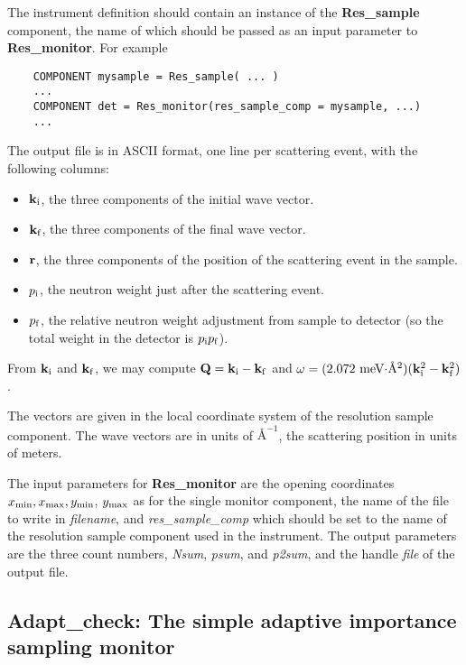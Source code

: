 The instrument definition should contain an instance of the
\textbf{Res\_sample} component, the name of which should be passed as an
input parameter to \textbf{Res\_monitor}. For example
\begin{verbatim}
    COMPONENT mysample = Res_sample( ... )
    ...
    COMPONENT det = Res_monitor(res_sample_comp = mysample, ...)
    ...
\end{verbatim}

The output file is in ASCII format, one line per scattering event, with
the following columns:
\begin{itemize}
\item ${\bf k}_{\rm i}$, the three components of the initial wave vector.
\item ${\bf k}_{\rm f}$, the three components of the final wave vector.
\item ${\bf r}$, the three components of the position of the scattering
  event in the sample.
\item $p_{\rm i}$, the neutron weight just after the scattering event.
\item $p_{\rm f}$, the relative neutron weight adjustment from sample to
  detector (so the total weight in the detector is $p_{\rm i}p_{\rm f}$).
\end{itemize}
From ${\bf k}_{\rm i}$ and ${\bf k}_{\rm f}$, we may compute ${\bf Q} =
{\bf k}_{\rm i} - {\bf k}_{\rm f}$ and $\omega = (\mbox{2.072
  meV$\cdot$\AA$^2$})({\bf k}_{\rm i}^2 - {\bf k}_{\rm f}^2)$.

The vectors are given in the local coordinate system of the resolution
sample component. The wave vectors are in units of $\mbox{\AA}^{-1}$, the
scattering position in units of meters.

The input parameters for {\bf Res\_monitor} are the opening coordinates
$x_{\rm min}, x_{\rm max}, y_{\rm min}$, $y_{\rm max}$ as for the single
monitor component, the name of the file to write in \textit{filename},
and \textit{res\_sample\_comp} which should be set to the name of the
resolution sample component used in the instrument.  The output
parameters are the three count numbers, \textit{Nsum}, \textit{psum},
and \textit{p2sum}, and the handle \textit{file} of the output file.

\subsection{Adapt\_check: The simple adaptive importance sampling monitor}
\label{s:adapt_check}

